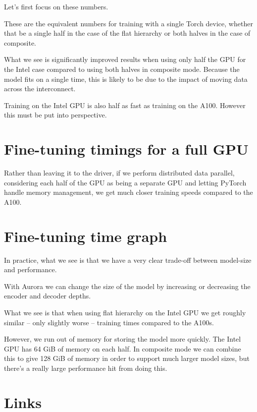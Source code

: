 \documentclass{article}
\begin{document}
Let's first focus on these numbers.

These are the equivalent numbers for training with a single Torch device, whether that be a single half in the case of the flat hierarchy or both halves in the case of composite.

What we see is significantly improved results when using only half the GPU for the Intel case compared to using both halves in composite mode. Because the model fits on a single time, this is likely to be due to the impact of moving data across the interconnect.

Training on the Intel GPU is also half as fast as training on the A100. However this must be put into perspective.


\section{Fine-tuning timings for a full GPU}

Rather than leaving it to the driver, if we perform distributed data parallel, considering each half of the GPU as being a separate GPU and letting PyTorch handle memory management, we get much closer training speeds compared to the A100.


\section{Fine-tuning time graph}

In practice, what we see is that we have a very clear trade-off between model-size and performance.

With Aurora we can change the size of the model by increasing or decreasing the encoder and decoder depths.

What we see is that when using flat hierarchy on the Intel GPU we get roughly similar -- only slightly worse -- training times compared to the A100s.

However, we run out of memory for storing the model more quickly. The Intel GPU has 64 GiB of memory on each half. In composite mode we can combine this to give 128 GiB of memory in order to support much larger model sizes, but there's a really large performance hit from doing this.


\section{Links}
\end{document}
